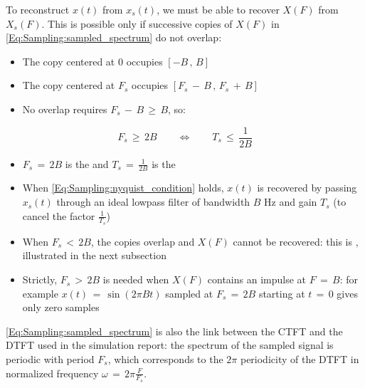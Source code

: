 To reconstruct $x(t)$ from $x_s(t)$, we must be able to recover $X(F)$ from $X_s(F)$. This is possible only if successive copies of $X(F)$ in \autoref{Eq:Sampling:sampled_spectrum} do not overlap:

\begin{itemize}

\item The copy centered at $0$ occupies $[-B \, , \, B]$

\item The copy centered at $F_s$ occupies $[F_s \, - \, B \, , \, F_s \, + \, B]$

\item No overlap requires $F_s \, - \, B \, \geq \, B$, so:

\end{itemize}

\begin{equation}
\boxed{
F_s \, \geq \, 2 B \qquad \Longleftrightarrow \qquad T_s \, \leq \, \frac{1}{2 B}
}
\label{Eq:Sampling:nyquist_condition}
\end{equation}

\begin{itemize}

\item $F_s \, = \, 2B$ is the  and $T_s \, = \, \displaystyle\frac{1}{2B}$ is the 

\item When \autoref{Eq:Sampling:nyquist_condition} holds, $x(t)$ is recovered by passing $x_s(t)$ through an ideal lowpass filter of bandwidth $B$ Hz and gain $T_s$ (to cancel the factor $\frac{1}{T_s}$)

\item When $F_s \, < \, 2B$, the copies overlap and $X(F)$ cannot be recovered: this is , illustrated in the next subsection

\item Strictly, $F_s \, > \, 2B$ is needed when $X(F)$ contains an impulse at $F \, = \, B$: for example $x(t) \, = \, \sin(2 \pi B t)$ sampled at $F_s \, = \, 2B$ starting at $t \, = \, 0$ gives only zero samples

\end{itemize}

\autoref{Eq:Sampling:sampled_spectrum} is also the link between the CTFT and the DTFT used in the simulation report: the spectrum of the sampled signal is periodic with period $F_s$, which corresponds to the $2\pi$ periodicity of the DTFT in normalized frequency $\omega \, = \, 2 \pi \displaystyle\frac{F}{F_s}$.

